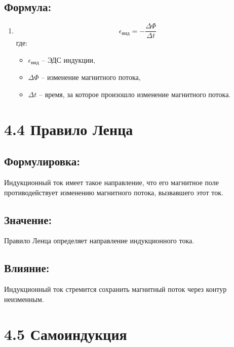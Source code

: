 \documentclass[a4paper,12pt]{article}
\begin{document}
\subsection*{Формула:}
\vspace{-3pt}
\begin{enumerate}[itemsep=0pt, topsep=0pt, parsep=3pt]
  \item 
  \vspace{-0.05em}
  $$ \epsilon_{инд} = -\frac{\Delta \Phi}{\Delta t} $$
  где:
  \begin{itemize}
    \item $\epsilon_{инд}$ – ЭДС индукции,
    \item $\Delta \Phi$ – изменение магнитного потока,
    \item $\Delta t$ – время, за которое произошло изменение магнитного потока.
  \end{itemize}
\end{enumerate}

\section*{4.4 Правило Ленца}
\vspace{-9pt}
\subsection*{Формулировка:}
\vspace{-3pt}
Индукционный ток имеет такое направление, что его магнитное поле противодействует изменению магнитного потока, вызвавшего этот ток.

\vspace{-9pt}
\subsection*{Значение:}
\vspace{-3pt}
Правило Ленца определяет направление индукционного тока.

\vspace{-9pt}
\subsection*{Влияние:}
\vspace{-3pt}
Индукционный ток стремится сохранить магнитный поток через контур неизменным.

\section*{4.5 Самоиндукция}
\vspace{-9pt}
\end{document}

